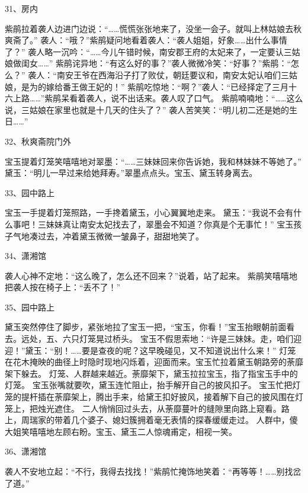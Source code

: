 31、房内\par
紫鹃拉着袭人边进门边说：“……慌慌张张地来了，没坐一会子。就叫上林姑娘去秋爽斋了。”
袭人：“哦？”紫鹃疑问地看着袭人：“袭人姐姐，好象……出什么事情了？”
袭人略一沉吟：“……今儿午错时候，南安郡王府的太妃来了，一定要认三姑娘做闺女……”
紫鹃诧异地：“有这么好的事？”袭人微微冷笑：“好事？”紫鹃：“怎么？”
袭人：“南安王爷在西海沿子打了败仗，朝廷要议和，南安太妃认咱们三姑娘，是为的嫁给番王做王妃的！”
紫鹃吃惊地：“啊？”袭人：“已经择定了三月十六上路……”紫鹃呆看着袭人，说不出话来。袭人叹了口气。
紫鹃喃喃地：“……这么说，三姑娘在家里也就是十几天的住头了？”
袭人苦笑笑：“明儿初二还是她的生日……”

32、秋爽斋院门外\par
宝玉提着灯笼笑嘻嘻地对翠墨：“……三妹妹回来你告诉她，我和林妹妹不等她了。”
黛玉：“明儿一早过来给她拜寿。”翠墨点点头。宝玉、黛玉转身离去。

33、园中路上\par
宝玉一手提着灯笼照路，一手搀着黛玉，小心翼翼地走来。
黛玉：“我说不会有什么事吧！三妹妹真让南安太妃找去了，翠墨会不知道？你真是个无事忙！”
宝玉孩子气地凑过去，冲着黛玉微微一皱鼻子，甜甜地笑了。

34、潇湘馆\par
袭人心神不定地：“这么晚了，怎么还不回来？”说着，站了起来。
紫鹃笑嘻嘻地把袭人按在椅子上：“丢不了！”

35、园中路上\par
黛玉突然停住了脚步，紧张地拉了宝玉一把，“宝玉，你看！”宝玉抬眼朝前面看去。远处，五、六只灯笼晃过桥头。
宝玉不假思索地：“许是三妹妹。走，咱们迎迎！”黛玉：“别！……要是查夜的呢？这早晚碰见，又不知道说出什么来！”
灯笼在花木掩映的曲径上时隐时现地闪烁着，迎面而来。宝玉忙拉着黛玉朝路旁的荼靡架下躲去。
灯笼、人群越来越近。荼靡架下，黛玉拉拉宝玉，指了指宝玉手中的灯笼。
宝玉张嘴就要吹，黛玉连忙阻止，抬手解开自己的披风扣子。
宝玉忙把灯笼的提杆插在荼靡架上，腾出手来，给黛王扣好披风，接着解下自己的披风围在灯笼上，把烛光遮住。
二人悄悄回过头去，从荼靡蔓叶的缝隙里向路上窥看。路上，周瑞家的带着几个婆子、媳妇簇拥着毫无表情的探春缓缓走过。
人群中，傻大姐笑嘻嘻地左顾右盼。宝玉、黛玉二人惊魂甫定，相视一笑。

36、潇湘馆\par
袭人不安地立起：“不行，我得去找找！”紫鹃忙掩饰地笑着：“再等等！……别找岔了道。”

